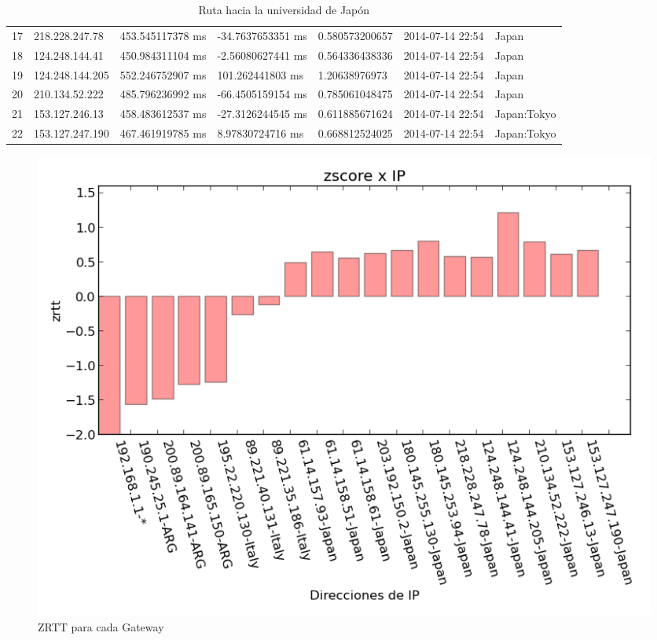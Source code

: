 \begin{table}[H]
{\begin{tabular}{lllllll}
17  & 218.228.247.78  & 453.545117378 ms & -34.7637653351 ms & 0.580573200657  & 2014-07-14 22:54 & Japan               \\
18  & 124.248.144.41  & 450.984311104 ms & -2.56080627441 ms & 0.564336438336  & 2014-07-14 22:54 & Japan               \\
19  & 124.248.144.205 & 552.246752907 ms & 101.262441803 ms  & 1.20638976973   & 2014-07-14 22:54 & Japan               \\
20  & 210.134.52.222  & 485.796236992 ms & -66.4505159154 ms & 0.785061048475  & 2014-07-14 22:54 & Japan               \\
21  & 153.127.246.13  & 458.483612537 ms & -27.3126244545 ms & 0.611885671624  & 2014-07-14 22:54 & Japan:Tokyo         \\
22  & 153.127.247.190 & 467.461919785 ms & 8.97830724716 ms  & 0.668812524025  & 2014-07-14 22:54 & Japan:Tokyo        
\end{tabular}
}
\caption{Ruta hacia la universidad de Japón}
\label{my-label}
\end{table}

\begin{figure}[H]
	\begin{center}
		  \includegraphics[scale=0.5]{../graficos_informe/jsc_zscore.png}
		  \caption{ZRTT para cada Gateway}
		  \label{fig:contra1}
	\end{center}
\end{figure}


